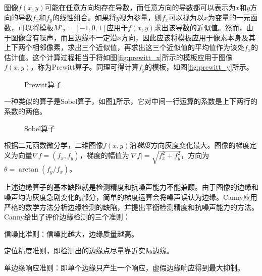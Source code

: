 图像$f(x,y)$可能在任意方向均存在导数，而任意方向的导数都可以表示为$x$和$y$方向的导数$f_x$和$f_y$的线性组合。如果将$y$视为参量，则$f_x$可以视为以$x$为变量的一元函数，可以将模板$M'_2=[-1,0,1]$应用于$f(x,y)$求出该导数的近似值。然而，由于图像含有噪声，而且边缘不一定沿$x$方向，因此应该将模板应用于像素本身及其上下两个相邻像素，求出三个近似值，再求出这三个近似值的平均值作为该处$f_x$的估计值。这个计算过程相当于将如图\ref{fig:prewitt_x}所示的模板应用于图像$f(x,y)$，称为Prewitt算子。同理可得计算$f_y$的模板，如图\ref{fig:prewitt_y}所示。
\begin{figure}[!h]
  \centering
  \hspace{1cm}
  \caption{Prewitt算子}
\end{figure}
一种类似的算子是Sobel算子，如图\ref{fig:sobel}所示，它对中间一行运算的系数是上下两行的系数的两倍。
\begin{figure}[!h]
  \centering
  \hspace{1cm}
  \caption{Sobel算子}
  \label{fig:sobel}
\end{figure}

根据二元函数微分学，二维图像$f(x,y)$沿\emph{梯度}方向灰度变化最大。图像的梯度定义为向量$\nabla f=(f_x,f_y)$，梯度的幅值为$|\nabla f|=\sqrt{f_x^2+f_y^2}$，方向为$\theta=\arctan(f_y/f_x)$。


上述边缘算子的基本缺陷就是检测精度和抗噪声能力不能兼顾。由于图像的边缘和噪声均为灰度急剧变化的部分，简单的梯度运算会将噪声误认为边缘。Canny应用严格的数学方法分析边缘检测的缺陷，并提出平衡检测精度和抗噪声能力的方法。Canny给出了评价边缘检测的三个准则：
\begin{asparaenum}[(1)]
\item 信噪比准则：信噪比越大，边缘质量越高。
\item  定位精度准则，即检测出的边缘点尽量靠近实际边缘。
\item 单边缘响应准则：即单个边缘只产生一个响应，虚假边缘响应得到最大抑制。
\end{asparaenum}

